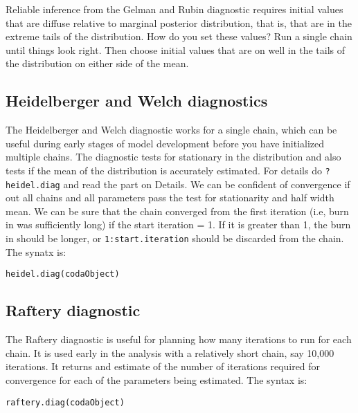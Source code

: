 \documentclass[12pt,english]{article}
\begin{document}
{Reliable inference from the Gelman and Rubin diagnostic requires initial values that are diffuse relative to marginal posterior distribution, that is, that are in the extreme tails of the distribution. How do you set these values? Run a single chain until things look right. Then choose initial values that are on well in the tails of the distribution on either side of the mean.

\subsection{Heidelberger and Welch diagnostics}

The Heidelberger and Welch diagnostic \citep{Heidelberger_and_Welch} works for a single chain, which can be useful during early stages of model development before you have initialized multiple chains. The diagnostic tests for stationary in the distribution and also tests if the mean of the distribution is accurately estimated. For details do \texttt{?heidel.diag} and read the part on Details. We can be confident of convergence if out all chains and all parameters pass the test for stationarity and half width mean. We can be sure that the chain converged from the first iteration (i.e, burn in was sufficiently long) if the start iteration = 1. If it is greater than 1, the burn in should be longer, or \texttt{1:start.iteration} should be discarded from the chain. The synatx is:

\begin{Verbatim}
heidel.diag(codaObject)
\end{Verbatim}

\subsection{Raftery diagnostic}

The Raftery diagnostic \citet{Raftery_et_al1995} is useful for planning how many iterations to run for each chain. It is used early in the analysis with a relatively short chain, say 10,000 iterations. It returns and estimate of the number of iterations required for convergence for each of the parameters being estimated. The syntax is:

\bigskip
\noindent\texttt{raftery.diag(codaObject)}

}
\end{document}

